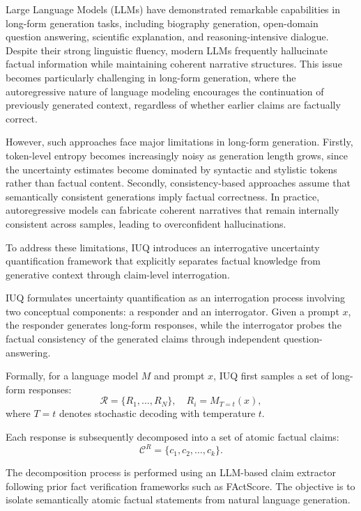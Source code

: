 Large Language Models (LLMs) have demonstrated remarkable capabilities in long-form generation tasks, including biography generation, open-domain question answering, scientific explanation, and reasoning-intensive dialogue. Despite their strong linguistic fluency, modern LLMs frequently hallucinate factual information while maintaining coherent narrative structures. This issue becomes particularly challenging in long-form generation, where the autoregressive nature of language modeling encourages the continuation of previously generated context, regardless of whether earlier claims are factually correct.

However, such approaches face major limitations in long-form generation. Firstly, token-level entropy becomes increasingly noisy as generation length grows, since the uncertainty estimates become dominated by syntactic and stylistic tokens rather than factual content. Secondly, consistency-based approaches assume that semantically consistent generations imply factual correctness. In practice, autoregressive models can fabricate coherent narratives that remain internally consistent across samples, leading to overconfident hallucinations.

To address these limitations, IUQ introduces an interrogative uncertainty quantification framework that explicitly separates factual knowledge from generative context through claim-level interrogation.


IUQ formulates uncertainty quantification as an interrogation process involving two conceptual components: a responder and an interrogator. Given a prompt $x$, the responder generates long-form responses, while the interrogator probes the factual consistency of the generated claims through independent question-answering.

Formally, for a language model $M$ and prompt $x$, IUQ first samples a set of long-form responses:
\begin{equation}
\mathcal{R}=\{R_1,\dots,R_N\}, \quad R_i=M_{T=t}(x),
\end{equation}
where $T=t$ denotes stochastic decoding with temperature $t$.

Each response is subsequently decomposed into a set of atomic factual claims:
\begin{equation}
\mathcal{C}^{R}=\{c_1,c_2,\dots,c_k\}.
\end{equation}

The decomposition process is performed using an LLM-based claim extractor following prior fact verification frameworks such as FActScore. The objective is to isolate semantically atomic factual statements from natural language generation.


